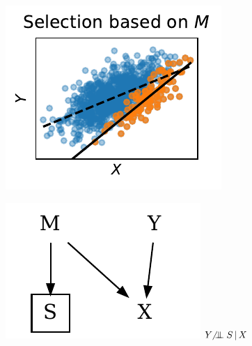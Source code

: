 \documentclass[a4paper,num-refs]{oup-contemporary}
\newcommand\indep{\protect\mathpalette{\protect\independenT}{\perp}}
\def\independenT#1#2{\mathrel{\rlap{$#1#2$}\mkern3.5mu{#1#2}}}
\newcommand\nindep{\protect\centernot\indep}
\begin{document}
\begin{figure}
\begin{minipage}{.3\textwidth}
\begin{minipage}{\textwidth}
    \begin{minipage}{\textwidth}
  \begin{minipage}{.57\textwidth}
\vspace{-7pt}
    \includegraphics[width=\textwidth]{figures/simulations/selecting_on_parent_or_child/selection_bias_2.pdf}
  \end{minipage}%
  \begin{minipage}{.42\textwidth}
    \includegraphics[width=\textwidth]{figures/graphs/sample_selection_bias_2.pdf}
    \centering
    \(Y \nindep S \, | \, X\)
  \end{minipage}
  \end{minipage}


\end{minipage}
\end{minipage}
\end{figure}
\end{document}
